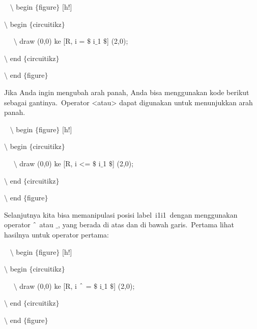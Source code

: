 \noindent 
~ $\setminus$ begin $ \{ $figure$ \} $ [h!]
\par


\noindent 
 $\setminus$ begin $ \{ $circuitikz$ \} $
\par


\noindent 
~~ $\setminus$ draw (0,0) ke [R, i = $\$$ i$ \_ $1 $\$$] (2,0);
\par


\noindent 
 $\setminus$ end $ \{ $circuitikz$ \} $
\par


\noindent 
 $\setminus$ end $ \{ $figure$ \} $ 
\par


\noindent 
Jika Anda ingin mengubah arah panah, Anda bisa menggunakan kode berikut sebagai gantinya. Operator <atau> dapat digunakan untuk menunjukkan arah panah.
\par


\noindent 
~ $\setminus$ begin $ \{ $figure$ \} $ [h!]
\par


\noindent 
 $\setminus$ begin $ \{ $circuitikz$ \} $
\par


\noindent 
~~ $\setminus$ draw (0,0) ke [R, i <= $\$$ i$ \_ $1 $\$$] (2,0);
\par


\noindent 
 $\setminus$ end $ \{ $circuitikz$ \} $
\par


\noindent 
 $\setminus$ end $ \{ $figure$ \} $ 
\par


\noindent 
Selanjutnya kita bisa memanipulasi posisi label i1i1 dengan menggunakan operator $ \string^ $ atau $ \_ $, yang berada di atas dan di bawah garis. Pertama lihat hasilnya untuk operator pertama:
\par


\noindent 
~ $\setminus$ begin $ \{ $figure$ \} $ [h!]
\par


\noindent 
 $\setminus$ begin $ \{ $circuitikz$ \} $
\par


\noindent 
~~ $\setminus$ draw (0,0) ke [R, i $ \string^ $ = $\$$ i$ \_ $1 $\$$] (2,0);
\par


\noindent 
 $\setminus$ end $ \{ $circuitikz$ \} $
\par


\noindent 
 $\setminus$ end $ \{ $figure$ \} $
\par


